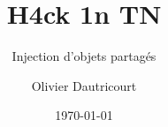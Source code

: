 \documentclass{beamer}
\title[s.o. injection]{H4ck 1n TN}
\subtitle{Injection d'objets partagés}
\author[H4ck1nTN]{Olivier Dautricourt}
\date{\today}
\begin{document}
\begin{frame}
\titlepage
\end{frame} 






\end{document}
